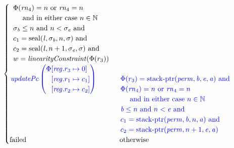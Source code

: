 \documentclass[a3paper]{article}
\newcommand{\tand}{\text{ and }}
\newcommand{\tor}{\text{ or }}
\newcommand{\totherwise}{\text{otherwise }}
\newcommand{\sourcecolor}{\color{blue}}
\newcommand{\nats}{\mathbb{N}}
\newcommand{\update}[2]{[#1 \mapsto #2]}
\newcommand{\updReg}[2]{\update{\reg.#1}{#2}}
\newcommand{\shareddom}[1]{\mathrm{#1}}
\newcommand{\perm}{\var{perm}}
\newcommand{\lin}{\var{l}}
\newcommand{\stkptr}[1]{\mathrm{stack\text{-}ptr}(#1)}
\newcommand{\seal}[1]{\shareddom{seal}(#1)}
\newcommand{\failed}{\mathrm{failed}}
\newcommand{\var}[1]{\mathit{#1}}
\newcommand{\rn}{\var{rn}}
\newcommand{\reg}{\var{reg}}
\newcommand{\baddr}{\var{b}}
\newcommand{\eaddr}{\var{e}}
\newcommand{\aaddr}{\var{a}}
\newcommand{\plainfun}[2]{
  \ifthenelse{\equal{#2}{}}
  {\mathit{#1}}
  {\mathit{#1}(#2)}
}
\newcommand{\linCons}[1]{\plainfun{linearityConstraint}{#1}}
\newcommand{\updPcAddr}[1]{\plainfun{updatePc}{#1}}
\begin{document}
\begin{align*}
\begin{cases}
\begin{array}[t]{l}
                                   \Phi(\rn_4) = n \tor \rn_4 = n \\
                                   \quad\text{ and in either case } n \in \nats \\
                                   \sigma_\baddr \leq n \tand n < \sigma_\eaddr \tand \\
                                   c_1 = \seal{\lin,\sigma_\baddr,n,\sigma} \tand \\
                                   c_2 = \seal{\lin,n+1,\sigma_\eaddr,\sigma} \tand \\
                                   w = \linCons{\Phi(r_3)}
                                 \end{array}\\
                                   \sourcecolor\left.
                                   \updPcAddr{}\left(
                                   \arraycolsep=0pt
                                   \begin{array}{rl}
                                     \Phi&\updReg{r_3}{0}\\
                                               &\updReg{r_1}{c_1}\\
                                               &\updReg{r_2}{c_2}
                                   \end{array} \right)\right.
&
                                 \sourcecolor\left.
                                 \arraycolsep=0pt
                                 \begin{array}[t]{l}
                                   \Phi(r_3) = \stkptr{\perm,\baddr,\eaddr,\aaddr} \tand \\
                                   \Phi(\rn_4) = n \tor \rn_4 = n \\
                                   \quad\text{ and in either case } n \in \nats \\
                                   \baddr \leq n \tand n < \eaddr \tand \\
                                   c_1 = \stkptr{\perm,\baddr,n,\aaddr} \tand \\
                                   c_2 = \stkptr{\perm,n+1,\eaddr,\aaddr} 
                                 \end{array} \right.\\
                                 \failed & \totherwise
                               \end{cases}
\end{align*}
\end{document}
